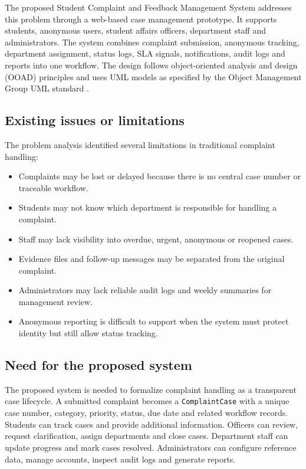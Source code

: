 \documentclass[11pt,a4paper]{article}
\begin{document}
The proposed Student Complaint and Feedback Management System addresses this problem through a web-based case management prototype. It supports students, anonymous users, student affairs officers, department staff and administrators. The system combines complaint submission, anonymous tracking, department assignment, status logs, SLA signals, notifications, audit logs and reports into one workflow. The design follows object-oriented analysis and design (OOAD) principles and uses UML models as specified by the Object Management Group UML standard \cite{OMG2017UML}.

\subsection{Existing issues or limitations}
The problem analysis identified several limitations in traditional complaint handling:
\begin{itemize}
  \item Complaints may be lost or delayed because there is no central case number or traceable workflow.
  \item Students may not know which department is responsible for handling a complaint.
  \item Staff may lack visibility into overdue, urgent, anonymous or reopened cases.
  \item Evidence files and follow-up messages may be separated from the original complaint.
  \item Administrators may lack reliable audit logs and weekly summaries for management review.
  \item Anonymous reporting is difficult to support when the system must protect identity but still allow status tracking.
\end{itemize}

\subsection{Need for the proposed system}
The proposed system is needed to formalize complaint handling as a transparent case lifecycle. A submitted complaint becomes a \texttt{ComplaintCase} with a unique case number, category, priority, status, due date and related workflow records. Students can track cases and provide additional information. Officers can review, request clarification, assign departments and close cases. Department staff can update progress and mark cases resolved. Administrators can configure reference data, manage accounts, inspect audit logs and generate reports.
\end{document}
